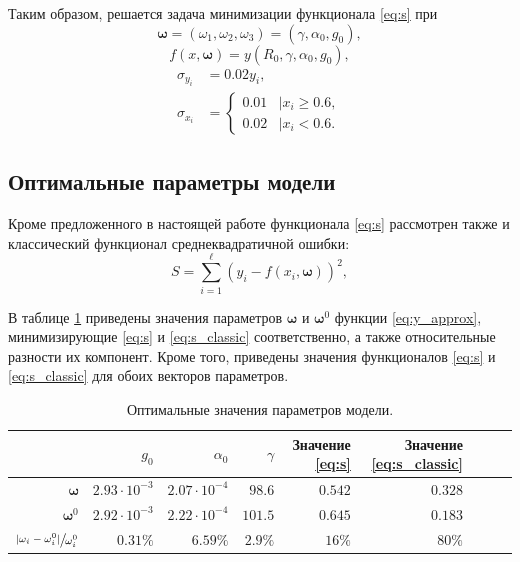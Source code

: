 \documentclass[tikz,10pt,a4paper]{article}
\newcommand{\bomega}{\boldsymbol{\omega}}
\begin{document}
Таким образом, решается задача минимизации функционала \eqref{eq:s} при
\[
  \bomega = (\omega_1, \omega_2, \omega_3) = (\gamma, \alpha_0, g_0),
\]
\[
  f(x, \bomega) = y(R_0, \gamma, \alpha_0, g_0),
\]
\begin{equation}
  \begin{array}{ll}
	\sigma_{y_i} &= 0.02 y_i,\\
	\sigma_{x_i} &= \left\{
	  \begin{array}{lr}
		0.01 & \mid x_i \geq 0.6, \\
		0.02 & \mid x_i < 0.6.
	  \end{array}
	\right.
  \end{array}
  \label{eq:sigmas_definition}
\end{equation}

\subsection{Оптимальные параметры модели}
Кроме предложенного в настоящей работе функционала \eqref{eq:s} рассмотрен
также и классический функционал среднеквадратичной ошибки:
\begin{equation}
  S = \sum_{i = 1}^\ell (y_i - f(x_i, \bomega))^2,
  \label{eq:s_classic}
\end{equation}

В таблице \ref{tabl:res_coeffs} приведены значения параметров $\bomega$ и $\bomega^0$
функции \eqref{eq:y_approx},
минимизирующие \eqref{eq:s} и \eqref{eq:s_classic} соответственно, а также относительные
разности их компонент. Кроме того, приведены значения функционалов \eqref{eq:s} и
\eqref{eq:s_classic} для обоих векторов параметров.

\begin{table}[h]
  \caption{Оптимальные значения параметров модели.}
  \centering
  \begin{tabular}{| r | r | r | r | r | r | r | r | r |}
	\hline
													& $g_0$					& $\alpha_0$			& $\gamma$				& Значение \eqref{eq:s} & Значение \eqref{eq:s_classic}	\\ \hline
	$\bomega$										& $2.93 \cdot 10^{-3}$	& $2.07 \cdot 10^{-4}$	& $98.6$				& $0.542$				& $0.328$						\\ \hline
	$\bomega^0$										& $2.92 \cdot 10^{-3}$	& $2.22 \cdot 10^{-4}$	& $101.5$				& $0.645$				& $0.183$						\\ \hline
	$\sfrac{|\omega_i - \omega^0_i|}{\omega^0_i}$	& $0.31 \%$				& $6.59 \%$				& $2.9 \%$				& $16 \%$				& $80 \%$						\\ \hline
  \end{tabular}
  \label{tabl:res_coeffs}
\end{table}
\end{document}
